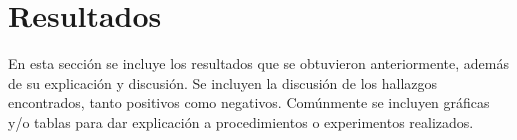 \chapter{Resultados}
En esta sección se incluye los resultados que se obtuvieron anteriormente, además de su explicación y discusión. Se incluyen la discusión de los hallazgos encontrados, tanto positivos como negativos. Comúnmente se incluyen gráficas y/o tablas para dar explicación a procedimientos o experimentos realizados.
